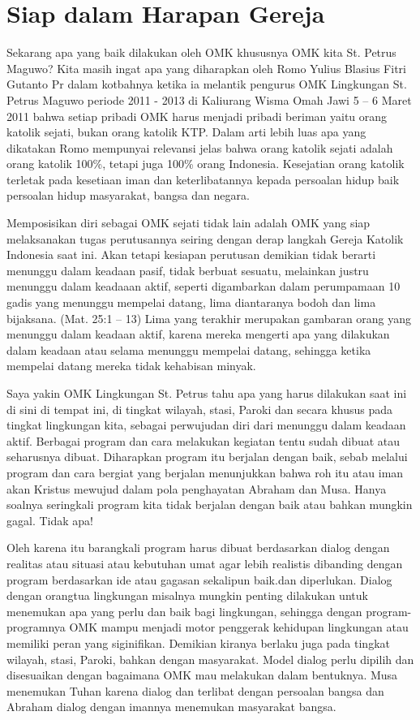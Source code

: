 \section*{Siap dalam Harapan Gereja}                                
 
     Sekarang apa yang baik dilakukan oleh OMK khususnya OMK kita St. Petrus Maguwo? Kita masih ingat apa yang diharapkan oleh Romo Yulius Blasius Fitri Gutanto Pr dalam kotbahnya ketika ia melantik pengurus OMK Lingkungan St. Petrus Maguwo periode 2011 - 2013 di Kaliurang  Wisma Omah Jawi 5 – 6 Maret 2011 bahwa setiap pribadi OMK harus menjadi pribadi beriman yaitu orang katolik sejati, bukan orang katolik KTP. Dalam arti lebih luas apa yang dikatakan Romo mempunyai relevansi jelas bahwa orang katolik sejati adalah orang katolik 100\%, tetapi  juga 100\% orang Indonesia. Kesejatian orang katolik terletak pada kesetiaan  iman dan keterlibatannya kepada persoalan hidup baik persoalan hidup masyarakat,  bangsa dan  negara.
 
      Memposisikan diri sebagai OMK sejati tidak lain adalah OMK yang siap melaksanakan tugas perutusannya seiring dengan derap langkah Gereja Katolik Indonesia saat ini. Akan tetapi kesiapan perutusan demikian tidak berarti menunggu dalam keadaan pasif, tidak berbuat sesuatu,  melainkan justru menunggu dalam keadaaan aktif, seperti digambarkan dalam perumpamaan 10 gadis yang menunggu mempelai datang, lima diantaranya bodoh dan lima bijaksana. (Mat. 25:1 – 13) Lima yang terakhir merupakan gambaran orang yang menunggu dalam keadaan aktif, karena mereka mengerti apa yang dilakukan dalam keadaan atau selama  menunggu mempelai datang, sehingga ketika mempelai datang mereka tidak kehabisan minyak.
 
      Saya yakin OMK Lingkungan St. Petrus tahu apa yang harus dilakukan saat ini  di sini di tempat ini, di tingkat wilayah, stasi, Paroki  dan secara khusus pada tingkat lingkungan kita, sebagai perwujudan diri dari menunggu dalam keadaan aktif. Berbagai program dan cara melakukan kegiatan tentu sudah dibuat atau seharusnya dibuat. Diharapkan program itu berjalan dengan baik, sebab melalui program dan cara bergiat yang berjalan menunjukkan bahwa roh itu atau iman  akan Kristus mewujud dalam pola penghayatan Abraham dan Musa. Hanya soalnya seringkali program kita tidak berjalan dengan baik atau bahkan mungkin gagal. Tidak apa!
     
       Oleh karena itu barangkali program harus dibuat berdasarkan dialog dengan realitas atau situasi atau kebutuhan umat agar lebih realistis dibanding dengan program berdasarkan ide atau gagasan sekalipun baik.dan diperlukan. Dialog dengan orangtua lingkungan misalnya mungkin penting dilakukan untuk menemukan apa yang perlu dan baik bagi lingkungan, sehingga dengan program-programnya OMK mampu menjadi motor penggerak kehidupan lingkungan atau memiliki peran yang siginifikan. Demikian kiranya berlaku juga pada tingkat wilayah, stasi, Paroki, bahkan dengan masyarakat. Model dialog perlu dipilih dan disesuaikan dengan bagaimana OMK mau melakukan dalam bentuknya. Musa menemukan Tuhan karena dialog dan terlibat dengan persoalan bangsa dan Abraham  dialog dengan imannya menemukan  masyarakat bangsa.
 
